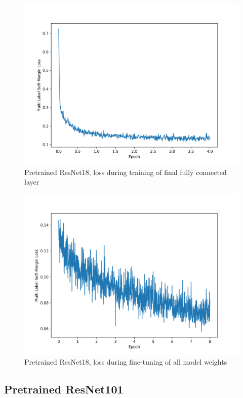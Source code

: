 \documentclass[10pt,twocolumn,letterpaper]{article}
\begin{document}
\begin{figure}
	\includegraphics[width=\columnwidth]{fig/plot_loss_resnet18_pretrained_fc.png}
    \caption{Pretrained ResNet18, loss during training of final fully connected layer}
    \label{fig:plot_loss_resnet18_pretrained_fc}
\end{figure}

\begin{figure}
	\includegraphics[width=\columnwidth]{fig/plot_loss_resnet18_pretrained_tune.png}
    \caption{Pretrained ResNet18, loss during fine-tuning of all model weights}
    \label{fig:plot_loss_resnet18_pretrained_tune}
\end{figure}

\subsection*{Pretrained ResNet101}
\end{document}
